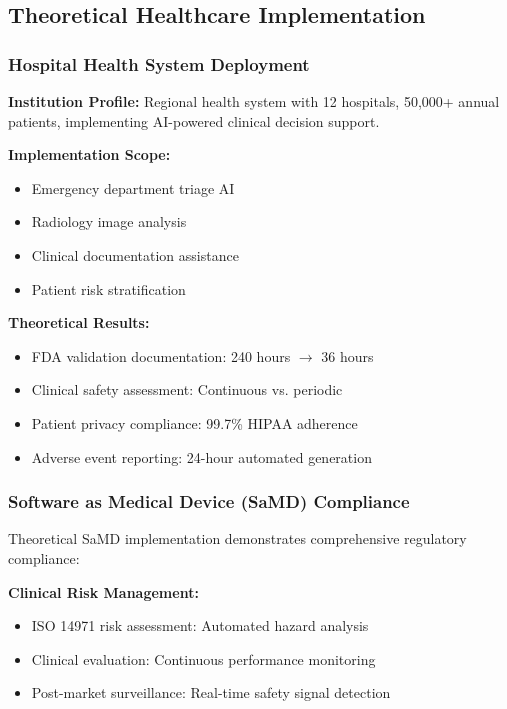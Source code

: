 \documentclass[12pt,a4paper]{article}
\begin{document}
\subsection{Theoretical Healthcare Implementation}

\subsubsection{Hospital Health System Deployment}

\textbf{Institution Profile:} Regional health system with 12 hospitals, 50,000+ annual patients, implementing AI-powered clinical decision support.

\textbf{Implementation Scope:}
\begin{itemize}
\item Emergency department triage AI
\item Radiology image analysis
\item Clinical documentation assistance
\item Patient risk stratification
\end{itemize}

\textbf{Theoretical Results:}
\begin{itemize}
\item FDA validation documentation: 240 hours $\rightarrow$ 36 hours
\item Clinical safety assessment: Continuous vs. periodic
\item Patient privacy compliance: 99.7\% HIPAA adherence
\item Adverse event reporting: 24-hour automated generation
\end{itemize}

\subsubsection{Software as Medical Device (SaMD) Compliance}

Theoretical SaMD implementation demonstrates comprehensive regulatory compliance:

\textbf{Clinical Risk Management:}
\begin{itemize}
\item ISO 14971 risk assessment: Automated hazard analysis
\item Clinical evaluation: Continuous performance monitoring
\item Post-market surveillance: Real-time safety signal detection
\end{itemize}
\end{document}
